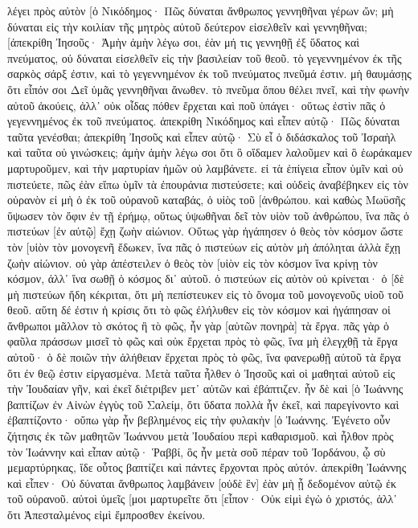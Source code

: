 λέγει πρὸς αὐτὸν [ὁ Νικόδημος· Πῶς δύναται ἄνθρωπος γεννηθῆναι γέρων ὤν; μὴ δύναται εἰς τὴν κοιλίαν τῆς μητρὸς αὐτοῦ δεύτερον εἰσελθεῖν καὶ γεννηθῆναι; 
[ἀπεκρίθη Ἰησοῦς· Ἀμὴν ἀμὴν λέγω σοι, ἐὰν μή τις γεννηθῇ ἐξ ὕδατος καὶ πνεύματος, οὐ δύναται εἰσελθεῖν εἰς τὴν βασιλείαν τοῦ θεοῦ. 
τὸ γεγεννημένον ἐκ τῆς σαρκὸς σάρξ ἐστιν, καὶ τὸ γεγεννημένον ἐκ τοῦ πνεύματος πνεῦμά ἐστιν. 
μὴ θαυμάσῃς ὅτι εἶπόν σοι Δεῖ ὑμᾶς γεννηθῆναι ἄνωθεν. 
τὸ πνεῦμα ὅπου θέλει πνεῖ, καὶ τὴν φωνὴν αὐτοῦ ἀκούεις, ἀλλ᾽ οὐκ οἶδας πόθεν ἔρχεται καὶ ποῦ ὑπάγει· οὕτως ἐστὶν πᾶς ὁ γεγεννημένος ἐκ τοῦ πνεύματος. 
ἀπεκρίθη Νικόδημος καὶ εἶπεν αὐτῷ· Πῶς δύναται ταῦτα γενέσθαι; 
ἀπεκρίθη Ἰησοῦς καὶ εἶπεν αὐτῷ· Σὺ εἶ ὁ διδάσκαλος τοῦ Ἰσραὴλ καὶ ταῦτα οὐ γινώσκεις; 
ἀμὴν ἀμὴν λέγω σοι ὅτι ὃ οἴδαμεν λαλοῦμεν καὶ ὃ ἑωράκαμεν μαρτυροῦμεν, καὶ τὴν μαρτυρίαν ἡμῶν οὐ λαμβάνετε. 
εἰ τὰ ἐπίγεια εἶπον ὑμῖν καὶ οὐ πιστεύετε, πῶς ἐὰν εἴπω ὑμῖν τὰ ἐπουράνια πιστεύσετε; 
καὶ οὐδεὶς ἀναβέβηκεν εἰς τὸν οὐρανὸν εἰ μὴ ὁ ἐκ τοῦ οὐρανοῦ καταβάς, ὁ υἱὸς τοῦ [ἀνθρώπου. 
καὶ καθὼς Μωϋσῆς ὕψωσεν τὸν ὄφιν ἐν τῇ ἐρήμῳ, οὕτως ὑψωθῆναι δεῖ τὸν υἱὸν τοῦ ἀνθρώπου, 
ἵνα πᾶς ὁ πιστεύων [ἐν αὐτῷ] ἔχῃ ζωὴν αἰώνιον. 
Οὕτως γὰρ ἠγάπησεν ὁ θεὸς τὸν κόσμον ὥστε τὸν [υἱὸν τὸν μονογενῆ ἔδωκεν, ἵνα πᾶς ὁ πιστεύων εἰς αὐτὸν μὴ ἀπόληται ἀλλὰ ἔχῃ ζωὴν αἰώνιον. 
οὐ γὰρ ἀπέστειλεν ὁ θεὸς τὸν [υἱὸν εἰς τὸν κόσμον ἵνα κρίνῃ τὸν κόσμον, ἀλλ᾽ ἵνα σωθῇ ὁ κόσμος δι᾽ αὐτοῦ. 
ὁ πιστεύων εἰς αὐτὸν οὐ κρίνεται· ὁ [δὲ μὴ πιστεύων ἤδη κέκριται, ὅτι μὴ πεπίστευκεν εἰς τὸ ὄνομα τοῦ μονογενοῦς υἱοῦ τοῦ θεοῦ. 
αὕτη δέ ἐστιν ἡ κρίσις ὅτι τὸ φῶς ἐλήλυθεν εἰς τὸν κόσμον καὶ ἠγάπησαν οἱ ἄνθρωποι μᾶλλον τὸ σκότος ἢ τὸ φῶς, ἦν γὰρ [αὐτῶν πονηρὰ] τὰ ἔργα. 
πᾶς γὰρ ὁ φαῦλα πράσσων μισεῖ τὸ φῶς καὶ οὐκ ἔρχεται πρὸς τὸ φῶς, ἵνα μὴ ἐλεγχθῇ τὰ ἔργα αὐτοῦ· 
ὁ δὲ ποιῶν τὴν ἀλήθειαν ἔρχεται πρὸς τὸ φῶς, ἵνα φανερωθῇ αὐτοῦ τὰ ἔργα ὅτι ἐν θεῷ ἐστιν εἰργασμένα. 
Μετὰ ταῦτα ἦλθεν ὁ Ἰησοῦς καὶ οἱ μαθηταὶ αὐτοῦ εἰς τὴν Ἰουδαίαν γῆν, καὶ ἐκεῖ διέτριβεν μετ᾽ αὐτῶν καὶ ἐβάπτιζεν. 
ἦν δὲ καὶ [ὁ Ἰωάννης βαπτίζων ἐν Αἰνὼν ἐγγὺς τοῦ Σαλείμ, ὅτι ὕδατα πολλὰ ἦν ἐκεῖ, καὶ παρεγίνοντο καὶ ἐβαπτίζοντο· 
οὔπω γὰρ ἦν βεβλημένος εἰς τὴν φυλακὴν [ὁ Ἰωάννης. 
Ἐγένετο οὖν ζήτησις ἐκ τῶν μαθητῶν Ἰωάννου μετὰ Ἰουδαίου περὶ καθαρισμοῦ. 
καὶ ἦλθον πρὸς τὸν Ἰωάννην καὶ εἶπαν αὐτῷ· Ῥαββί, ὃς ἦν μετὰ σοῦ πέραν τοῦ Ἰορδάνου, ᾧ σὺ μεμαρτύρηκας, ἴδε οὗτος βαπτίζει καὶ πάντες ἔρχονται πρὸς αὐτόν. 
ἀπεκρίθη Ἰωάννης καὶ εἶπεν· Οὐ δύναται ἄνθρωπος λαμβάνειν [οὐδὲ ἓν] ἐὰν μὴ ᾖ δεδομένον αὐτῷ ἐκ τοῦ οὐρανοῦ. 
αὐτοὶ ὑμεῖς [μοι μαρτυρεῖτε ὅτι [εἶπον· Οὐκ εἰμὶ ἐγὼ ὁ χριστός, ἀλλ᾽ ὅτι Ἀπεσταλμένος εἰμὶ ἔμπροσθεν ἐκείνου. 
